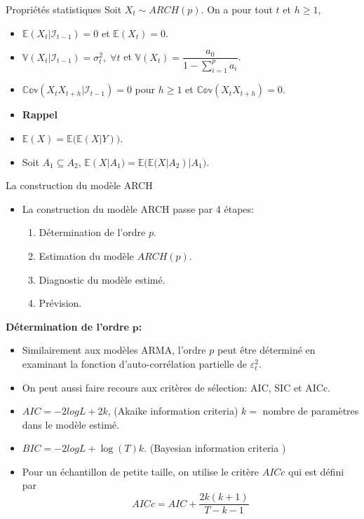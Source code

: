 \documentclass[
  ignorenonframetext,
]{beamer}
\begin{document}
\begin{frame}{Propriétés statistiques}
\protect\hypertarget{propriuxe9tuxe9s-statistiques}{}
Soit \(X_t \sim ARCH(p)\). On a pour tout \(t\) et \(h \geq 1\),

\begin{itemize}[<+->]
\item
  \(\mathbb{E}\left(X_t|\mathcal{I}_{t-1} \right)=0\) et
  \(\mathbb{E}\left(X_t \right)=0\).
\item
  \(\mathbb{V}\left(X_t|\mathcal{I}_{t-1} \right)= \sigma^2_t, \; \forall t\)
  et
  \(\mathbb{V}\left(X_t \right)=\dfrac{a_0}{1-\displaystyle \sum_{i=1}^pa_i}\).
\item
  \(\mathbb{Cov}\left(X_t X_{t+h}|\mathcal{I}_{t-1} \right)=0\) pour
  \(h \geq 1\) et \(\mathbb{Cov}\left(X_t X_{t+h}\right)=0\).
\item
  \textbf{Rappel}
\item
  \(\mathbb{E}(X)=\mathbb{E}\big(\mathbb{E}(X|Y)\big)\).
\item
  Soit \(A_1 \subseteq A_2\),
  \(\mathbb{E}(X|A_1)=\mathbb{E}\big(\mathbb{E}(X|A_2)|A_1\big)\).
\end{itemize}
\end{frame}

\begin{frame}{La construction du modèle ARCH}
\protect\hypertarget{la-construction-du-moduxe8le-arch}{}
\begin{itemize}[<+->]
\item
  La construction du modèle ARCH passe par 4 étapes:

  \begin{enumerate}[<+->]
  \item
    Détermination de l'ordre \(p\).
  \item
    Estimation du modèle \(ARCH(p)\).
  \item
    Diagnostic du modèle estimé.
  \item
    Prévision.
  \end{enumerate}
\end{itemize}
\end{frame}

\begin{frame}
\textbf{Détermination de l'ordre} \(\mathbf{p}\)\textbf{:}

\begin{itemize}[<+->]
\item
  Similairement aux modèles ARMA, l'ordre \(p\) peut être déterminé en
  examinant la fonction d'auto-corrélation partielle de
  \(\varepsilon_t^2\).
\item
  On peut aussi faire recours aux critères de sélection: AIC, SIC et
  AICc.
\item
  \(AIC=-2logL+2k\), (Akaike information criteria) \(k=\) nombre de
  paramètres dans le modèle estimé.
\item
  \(BIC=-2logL+\log(T)k\). (Bayesian information criteria )
\item
  Pour un échantillon de petite taille, on utilise le critère \(AICc\)
  qui est défini par \[
  AICc=AIC+\dfrac{2k(k+1)}{T-k-1}
  \]
\end{itemize}
\end{frame}
\end{document}
